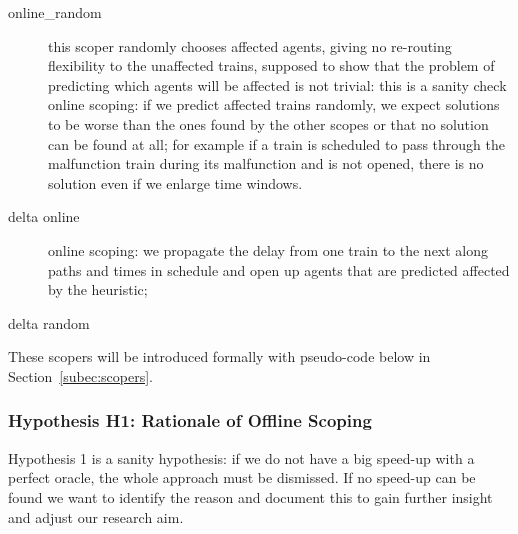 \documentclass{article}
\begin{document}
\begin{description}
\item[online\_random] this scoper randomly chooses affected agents, giving no re-routing flexibility to the unaffected trains, supposed to show that the problem of predicting which agents will be affected is not trivial: this is a sanity check online scoping: if we predict affected trains randomly, we expect solutions to be worse than the ones found by the other scopes or that no solution can be found at all; for example if a train is scheduled to pass through the malfunction train during its malfunction and is not opened, there is no solution even if we enlarge time windows.
\end{description}

\begin{description}


\item[delta online] online scoping: we propagate the delay from one train to the next along paths and times in schedule and open up agents that are predicted affected by the heuristic;
\item[delta random]
\end{description}
These scopers will be introduced formally with pseudo-code below in Section~\ref{subec:scopers}.



\subsubsection{Hypothesis H1: Rationale of Offline Scoping}\label{subec:H1}

Hypothesis 1 is a sanity hypothesis: if we do not have a big speed-up with a perfect oracle, the whole approach must be dismissed. If no speed-up can be found we want to identify the reason and document this to gain further insight and adjust our research aim.
\end{document}
